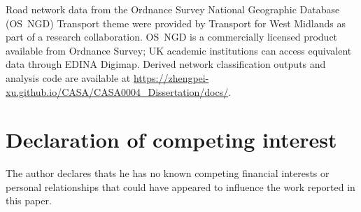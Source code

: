 \documentclass[final,5p,times,twocolumn,authoryear]{elsarticle}
\begin{document}
Road network data from the Ordnance Survey National Geographic Database (OS~NGD) Transport theme were provided by Transport for West Midlands as part of a research collaboration. OS~NGD is a commercially licensed product available from Ordnance Survey; UK academic institutions can access equivalent data through EDINA Digimap. Derived network classification outputs and analysis code are available at \url{https://zhengpei-xu.github.io/CASA/CASA0004_Dissertation/docs/}.

\section*{Declaration of competing interest}

The author declares thats he has no known competing financial interests or personal relationships that could have appeared to influence the work reported in this paper.



\end{document}

